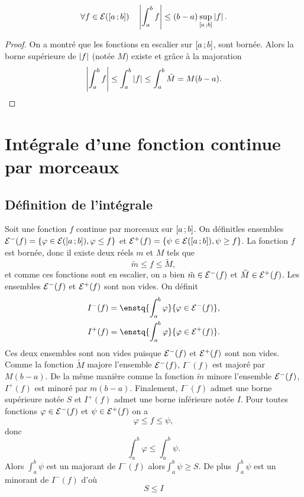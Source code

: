 \begin{corth}
  \begin{equation}
    \forall f \in \mathcal{E}(\left[ a \, ;  b \right]) \quad \left\lvert\int_a^b f\right\rvert \leq (b-a) \sup\limits_{\left[ a \, ;  b \right]} \left\lvert f\right\rvert.
  \end{equation}
\end{corth}
\begin{proof}
  On a montré que les fonctions en escalier sur $\left[ a \, ;  b \right]$, sont bornée. Alors la borne supérieure de $\left\lvert f\right\rvert$ (notée $M$) existe et grâce à la majoration
  \begin{equation}
    \left\lvert\int_a^b f\right\rvert \leq \int_a^b \left\lvert f\right\rvert \leq \int_a^b \tilde{M} = M(b-a).
  \end{equation}
\end{proof}

\section{Intégrale d'une fonction continue par morceaux}

\subsection{Définition de l'intégrale}

Soit une fonction $f$ continue par morceaux sur $\left[ a \, ;  b \right]$. On définitles ensembles $\mathcal{E}^{-}(f)=\{\varphi \in \mathcal{E}(\left[ a \, ;  b \right]), \varphi \leq f\}$ et $\mathcal{E}^{+}(f)=\{\psi \in \mathcal{E}(\left[ a \, ;  b \right]), \psi \geq f\}$. La fonction $f$ est bornée, donc il existe deux réels $m$ et $M$ tels que 
\begin{equation}
  \tilde{m} \leq f \leq \tilde{M},
\end{equation}
et comme ces fonctions sont en escalier, on a bien $\tilde{m} \in \mathcal{E}^{-}(f)$ et $\tilde{M} \in \mathcal{E}^{+}(f)$. Les ensembles $\mathcal{E}^{-}(f)$ et $\mathcal{E}^{+}(f)$ sont non vides. On définit 
\begin{align}
I^{-}(f)=\enstq{\int_a^b \varphi}{\varphi \in \E^{-}(f)}, \\
I^{+}(f)=\enstq{\int_a^b \varphi}{\varphi \in \E^{+}(f)}.
\end{align}
 Ces deux ensembles sont non vides puisque $\mathcal{E}^{-}(f)$ et $\mathcal{E}^{+}(f)$ sont non vides. Comme la fonction $\tilde{M}$ majore l'ensemble $\mathcal{E}^{-}(f)$, $I^{-}(f)$ est majoré par $M(b-a)$. De la même manière comme la fonction $\tilde{m}$ minore l'ensemble $\mathcal{E}^{-}(f)$, $I^{+}(f)$ est minoré par $m(b-a)$. Finalement, $I^{-}(f)$ admet une borne supérieure notée $S$ et $I^{+}(f)$ admet une borne inférieure notée $I$. Pour toutes fonctions $\varphi \in \mathcal{E}^{-}(f)$ et $\psi \in \mathcal{E}^{+}(f)$ on a
\begin{equation}
  \varphi \leq f \leq \psi,
\end{equation}
donc
\begin{equation}
  \int_a^b \varphi \leq \int_a^b \psi.
\end{equation}
Alors $\int_a^b \psi$ est un majorant de $I^{-}(f)$ alors$\int_a^b \psi \geq S$. De plus $\int_a^b \psi$ est un minorant de $I^{-}(f)$ d'où
\begin{equation}
  S \leq I
\end{equation}

